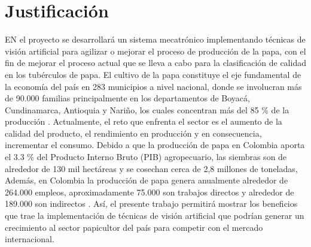 \section{Justificación}

EN el proyecto se desarrollará un sistema mecatrónico implementando técnicas de visión artificial para agilizar o mejorar el proceso de producción de la papa, con el fin de mejorar el proceso actual que se lleva a cabo para la clasificación de calidad en los tubérculos de papa. El cultivo de la papa constituye el eje fundamental de la economía del país en 283 municipios a nivel nacional, donde se involucran más de 90.000 familias principalmente en los departamentos de Boyacá, Cundinamarca, Antioquia y Nariño, los cuales concentran más del 85 \% de la producción \cite{referencia1}. Actualmente, el reto que enfrenta el sector es el aumento de la calidad del producto, el rendimiento en producción y en consecuencia, incrementar el consumo. Debido a que la producción de papa en Colombia aporta el 3.3 \% del Producto Interno Bruto (PIB) agropecuario, las siembras son de alrededor de 130 mil hectáreas y se cosechan cerca de 2,8 millones de toneladas, Además, en Colombia la producción de papa genera anualmente alrededor de 264.000 empleos, aproximadamente 75.000 son trabajos directos y alrededor de 189.000 son indirectos \cite{referencia2}.
Así, el presente trabajo permitirá mostrar los beneficios que trae la implementación de técnicas de visión artificial que podrían generar un  crecimiento al sector papicultor del país para competir con el mercado internacional.


